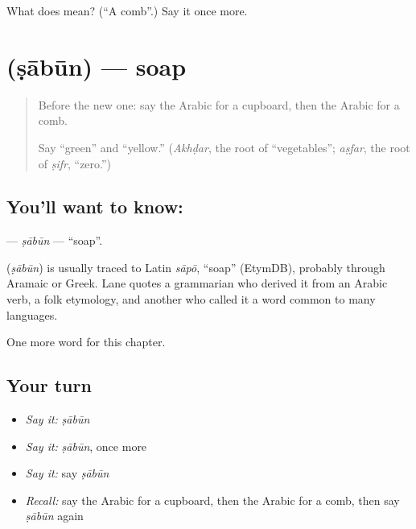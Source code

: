 \begin{tcolorbox}[breakable,colback=teal!4,colframe=teal!35!black,title={Before you move on}]
What does  mean? (\textquotedblleft{}A comb\textquotedblright{}.) Say it once more.
\end{tcolorbox}
\section[\texorpdfstring{\ar{صابون} (ṣābūn)}{صابون (ṣābūn)}]{ (ṣābūn) — soap}

\label{lesson:AR-C122-sabun}



\begin{quote}
Before the new one: say the Arabic for a cupboard, then the Arabic for a comb.

Say \textquotedblleft{}green\textquotedblright{} and \textquotedblleft{}yellow.\textquotedblright{} (\emph{Akhḍar}, the root of \textquotedblleft{}vegetables\textquotedblright{}; \emph{aṣfar}, the root of \emph{ṣifr}, \textquotedblleft{}zero.\textquotedblright{})
\end{quote}

\subsection*{You'll want to know: }
\textbf{} — \emph{ṣābūn} — \textquotedblleft{}soap\textquotedblright{}.

\begin{cousinweb}
\textbf{} (\emph{ṣābūn}) is usually traced to Latin \emph{sāpō}, \textquotedblleft{}soap\textquotedblright{} (EtymDB), probably through Aramaic or Greek. Lane quotes a grammarian who derived it from an Arabic verb, a folk etymology, and another who called it a word common to many languages.
\end{cousinweb}

\begin{grammarlens}[title={What you've built}]
One more word for this chapter.
\end{grammarlens}

\subsection*{Your turn}
\begin{itemize}
\raggedright
  \item \emph{Say it:} \emph{ṣābūn}
  \item \emph{Say it:} \emph{ṣābūn}, once more
  \item \emph{Say it:} say \emph{ṣābūn}
  \item \emph{Recall:} say the Arabic for a cupboard, then the Arabic for a comb, then say \emph{ṣābūn} again
\end{itemize}

